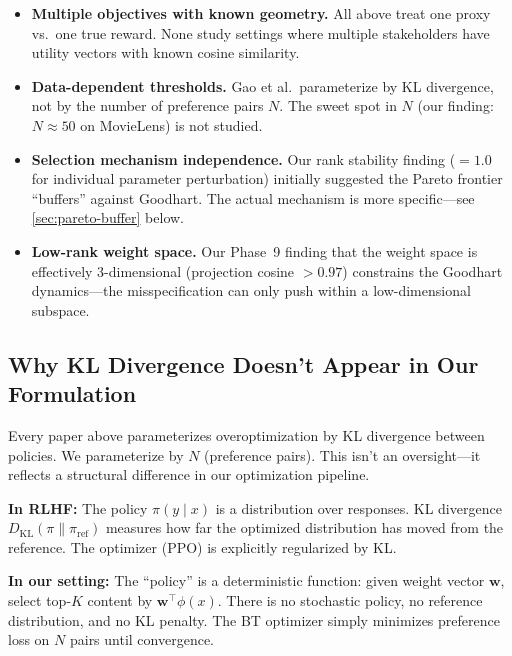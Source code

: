 \documentclass[11pt]{article}
\begin{document}
\begin{itemize}
  \item \textbf{Multiple objectives with known geometry.} All above
    treat one proxy vs.\ one true reward. None study settings where
    multiple stakeholders have utility vectors with known cosine
    similarity.

  \item \textbf{Data-dependent thresholds.} Gao et al.\ parameterize
    by KL divergence, not by the number of preference pairs $N$. The
    sweet spot in $N$ (our finding: $N \approx 50$ on MovieLens) is not
    studied.

  \item \textbf{Selection mechanism independence.} Our rank stability
    finding ($= 1.0$ for individual parameter perturbation) initially
    suggested the Pareto frontier ``buffers'' against Goodhart. The
    actual mechanism is more specific---see \cref{sec:pareto-buffer}
    below.

  \item \textbf{Low-rank weight space.} Our Phase~9 finding that
    the weight space is effectively 3-dimensional (projection cosine
    $> 0.97$) constrains the Goodhart dynamics---the
    misspecification can only push within a low-dimensional subspace.
\end{itemize}

\subsection{Why KL Divergence Doesn't Appear in Our Formulation}
\label{sec:why-no-kl}

Every paper above parameterizes overoptimization by KL divergence
between policies. We parameterize by $N$ (preference pairs). This isn't
an oversight---it reflects a structural difference in our optimization
pipeline.

\textbf{In RLHF:} The policy $\pi(y \mid x)$ is a distribution over
responses. KL divergence $D_{\text{KL}}(\pi \| \pi_{\text{ref}})$
measures how far the optimized distribution has moved from the
reference. The optimizer (PPO) is explicitly regularized by KL.

\textbf{In our setting:} The ``policy'' is a deterministic function:
given weight vector $\mathbf{w}$, select top-$K$ content by
$\mathbf{w}^\top \phi(x)$. There is no stochastic policy, no reference
distribution, and no KL penalty. The BT optimizer simply minimizes
preference loss on $N$ pairs until convergence.
\end{document}
